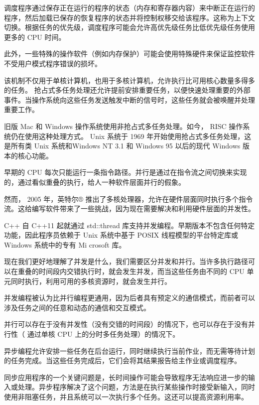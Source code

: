 调度程序通过保存正在运行的程序的状态（内存和寄存器内容）来中断正在运行的程序，然后加载已保存的恢复程序的状态并将控制权移交给该程序。这称为上下文切换。根据任务的优先级，调度程序可能会允许高优先级任务比低优先级任务使用更多的 CPU 时间。

此外，一些特殊的操作软件（例如内存保护）可能会使用特殊硬件来保证监控软件不受用户模式程序错误的损坏。

该机制不仅用于单核计算机，也用于多核计算机，允许执行比可用核心数量多得多的任务。
抢占式多任务处理还允许提前安排重要任务，以便快速处理重要的外部事件。当操作系统向这些任务发送触发中断的信号时，这些任务就会被唤醒并处理重要工作。

旧版 Mac 和 Windows 操作系统使用非抢占式多任务处理。如今， RISC 操作系统仍在使用这种处理方式。 Unix 系统于 1969 年开始使用抢占式多任务处理，这是所有类 Unix 系统和Windows NT 3.1 和 Windows 95 以后的现代 Windows 版本的核心功能。

早期的 CPU 每次只能运行一条指令路径。并行是通过在指令流之间切换来实现的，通过看似重叠的执行，给人一种软件层面并行的假象。

然而， 2005 年，英特尔® 推出了多核处理器，允许在硬件层面同时执行多个指令流。这给编写软件带来了一些挑战，因为现在需要解决和利用硬件层面的并发性。

C++ 自 C++11 起就通过 std::thread 库支持并发编程。早期版本不包含任何特定功能，因此程序员依赖于 Unix 系统中基于 POSIX 线程模型的平台特定库或 Windows 系统中的专有 Mi crosoft 库。

现在我们更好地理解了并发是什么，我们需要区分并发和并行。当许多执行路径可以在重叠的时间段内交错执行时，就会发生并发，而当这些任务由不同的 CPU 单元同时执行，利用可用的多核资源时，就会发生并行。


并发编程被认为比并行编程更通用，因为后者具有预定义的通信模式，而前者可以涉及任务之间的任意和动态的通信和交互模式。

并行可以存在于没有并发性（没有交错的时间段）的情况下，也可以存在于没有并行性（ 通过单核 CPU 上的分时多任务处理）的情况下。


异步编程允许安排一些任务在后台运行，同时继续执行当前作业，而无需等待计划的任务完成。当这些任务完成后，它们会将其结果报告给主作业或调度程序。

同步应用程序的一个关键问题是，长时间操作可能会导致程序无法响应进一步的输入或处理。异步程序解决了这个问题，方法是在执行某些操作时接受新输入，同时使用非阻塞任务，并且系统可以一次执行多个任务。这还可以提高资源利用率。

